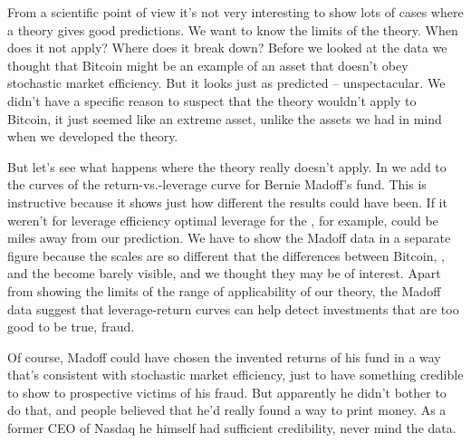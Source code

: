 From a scientific point of view it's not very interesting to show lots of cases where a theory gives good predictions. We want to know the limits of the theory. When does it not apply? Where does it break down? Before we looked at the data we thought that Bitcoin might be an example of an asset that doesn't obey stochastic market efficiency. But it looks just as predicted -- unspectacular. We didn't have a specific reason to suspect that the theory wouldn't apply to Bitcoin, it just seemed like an extreme asset, unlike the assets we had in mind when we developed the theory. 

But let's see what happens where the theory really doesn't apply. In  we add to the curves of  the return-vs.-leverage curve for Bernie Madoff's fund. This is instructive because it shows just how different the results could have been. If it weren't for leverage efficiency optimal leverage for the \SPT, for example, could be miles away from our prediction. We have to show the Madoff data in a separate figure 
because the scales are so different that the differences between Bitcoin, \SPT, and the \DAX become barely visible, and we thought they may be of interest.
Apart from showing the limits of the range of applicability of our theory, the Madoff data suggest that leverage-return curves can help detect investments that are too good to be true, \ie fraud. 

Of course, Madoff could have chosen the invented returns of his fund in a way that's consistent with stochastic market efficiency, just to have something credible to show to prospective victims of his fraud. But apparently he didn't bother to do that, and people believed that he'd really found a way to print money. As a former CEO of Nasdaq he himself had sufficient credibility, never mind the data.

